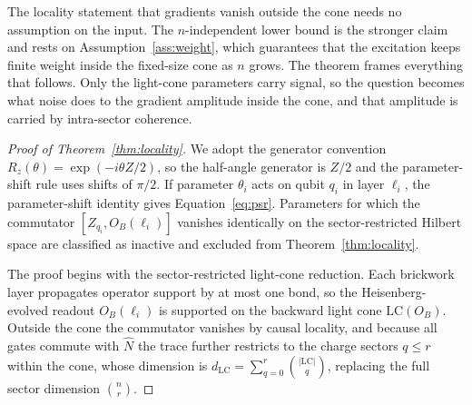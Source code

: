 \documentclass{article}
\newcommand{\LC}{\mathrm{LC}}
\begin{document}
The locality statement that gradients vanish outside the cone needs no assumption on the input. The $n$-independent lower bound is the stronger claim and rests on Assumption~\ref{ass:weight}, which guarantees that the excitation keeps finite weight inside the fixed-size cone as $n$ grows. The theorem frames everything that follows. Only the light-cone parameters carry signal, so the question becomes what noise does to the gradient amplitude inside the cone, and that amplitude is carried by intra-sector coherence.

\begin{proof}[Proof of Theorem~\ref{thm:locality}]
We adopt the generator convention $R_z(\theta)=\exp(-i\theta Z/2)$, so the half-angle generator is $Z/2$ and the parameter-shift rule uses shifts of $\pi/2$. If parameter $\theta_i$ acts on qubit $q_i$ in layer $\ell_i$, the parameter-shift identity gives Equation~\eqref{eq:psr}. Parameters for which the commutator $[Z_{q_i},O_B(\ell_i)]$ vanishes identically on the sector-restricted Hilbert space are classified as inactive and excluded from Theorem~\ref{thm:locality}.

The proof begins with the sector-restricted light-cone reduction. Each brickwork layer propagates operator support by at most one bond, so the Heisenberg-evolved readout $O_B(\ell_i)$ is supported on the backward light cone $\LC(O_B)$. Outside the cone the commutator vanishes by causal locality, and because all gates commute with $\hat N$ the trace further restricts to the charge sectors $q\leq r$ within the cone, whose dimension is $d_{\LC}=\sum_{q=0}^{r}\binom{|\LC|}{q}$, replacing the full sector dimension $\binom{n}{r}$.


\end{proof}
\end{document}

